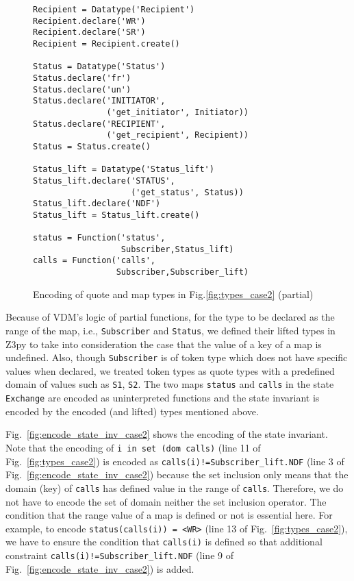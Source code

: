 \begin{figure}[t]
\begin{center}
\begin{mdframed}[roundcorner=5pt,shadow=true]
\begin{Verbatim}[fontsize=\small]
Recipient = Datatype('Recipient')
Recipient.declare('WR')
Recipient.declare('SR')
Recipient = Recipient.create()

Status = Datatype('Status')
Status.declare('fr')
Status.declare('un')
Status.declare('INITIATOR',
               ('get_initiator', Initiator))
Status.declare('RECIPIENT',
               ('get_recipient', Recipient))
Status = Status.create()

Status_lift = Datatype('Status_lift')
Status_lift.declare('STATUS',
                    ('get_status', Status))
Status_lift.declare('NDF')
Status_lift = Status_lift.create()

status = Function('status',
                  Subscriber,Status_lift)
calls = Function('calls',
                 Subscriber,Subscriber_lift)
\end{Verbatim}
\end{mdframed}
\vspace{-10pt}
\caption{Encoding of quote and map types in Fig.\ref{fig:types_case2} (partial)}
\label{fig:encode_types_case2}
\end{center}
\vspace{-15pt}
\end{figure}

Because of VDM's logic of partial functions, for the type to be declared as the range of the map, i.e., {\tt Subscriber} and {\tt Status}, we defined their lifted types in Z3py to take into consideration the case that the value of a key of a map is undefined. Also, though {\tt Subscriber} is of token type which does not have specific values when declared, we treated token types as quote types with a predefined domain of values such as {\tt S1}, {\tt S2}. The two maps {\tt status} and {\tt calls} in the state {\tt Exchange} are encoded as uninterpreted functions and the state invariant is encoded by the encoded (and lifted) types mentioned above. 

Fig.~\ref{fig:encode_state_inv_case2} shows the encoding of the state invariant. Note that the encoding of {\tt i in set (dom calls)} (line 11 of Fig.~\ref{fig:types_case2}) is encoded as {\tt calls(i)!=Subscriber\_lift.NDF} (line 3 of Fig.~\ref{fig:encode_state_inv_case2}) because the set inclusion only means that the domain (key) of {\tt calls} has defined value in the range of {\tt calls}. Therefore, we do not have to encode the set of domain neither the set inclusion operator. The condition that the range value of a map is defined or not is essential here. For example, to encode {\tt status(calls(i)) = <WR>} (line 13 of Fig.~\ref{fig:types_case2}), we have to ensure the condition that {\tt calls(i)} is defined so that additional constraint {\tt calls(i)!=Subscriber\_lift.NDF} (line 9 of Fig.~\ref{fig:encode_state_inv_case2}) is added.

